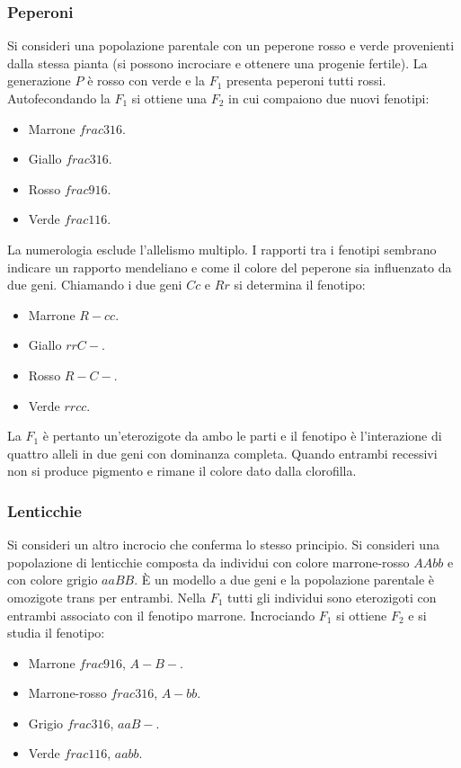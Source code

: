 \subsubsection{Peperoni}
Si consideri una popolazione parentale con un peperone rosso e verde provenienti dalla stessa pianta (si possono incrociare e ottenere una progenie fertile). La generazione $P$ \`e 
rosso con verde e la $F_1$ presenta peperoni tutti rossi. Autofecondando la $F_1$ si ottiene una $F_2$ in cui compaiono due nuovi fenotipi:
\begin{itemize}
	\item Marrone $frac{3}{16}$.
	\item Giallo $frac{3}{16}$.
	\item Rosso $frac{9}{16}$.
	\item Verde $frac{1}{16}$.
\end{itemize}
La numerologia esclude l'allelismo multiplo. I rapporti tra i fenotipi sembrano indicare un rapporto mendeliano e come il colore del peperone sia influenzato da due geni. Chiamando i due
geni $Cc$ e $Rr$ si determina il
fenotipo:
\begin{itemize}
	\item Marrone $R-cc$.
	\item Giallo $rrC-$.
	\item Rosso $R-C-$.
	\item Verde $rrcc$.
\end{itemize}
La $F_1$ \`e pertanto un'eterozigote da ambo le parti e il fenotipo \`e l'interazione di quattro alleli in due geni con dominanza completa. Quando entrambi recessivi non si produce
pigmento e rimane il colore dato dalla clorofilla.
\subsubsection{Lenticchie}
Si consideri un altro incrocio che conferma lo stesso principio. Si consideri una popolazione di lenticchie composta da individui con colore marrone-rosso $AAbb$ e con colore grigio 
$aaBB$. \`E un modello a due geni e la popolazione parentale \`e omozigote trans per entrambi. Nella $F_1$ tutti gli individui sono eterozigoti con entrambi associato con il fenotipo 
marrone. Incrociando $F_1$ si ottiene $F_2$ e si studia il fenotipo:
\begin{itemize}
	\item Marrone $frac{9}{16}$, $A-B-$.
	\item Marrone-rosso $frac{3}{16}$, $A-bb$.
	\item Grigio $frac{3}{16}$, $aaB-$.
	\item Verde $frac{1}{16}$, $aabb$.
\end{itemize}
